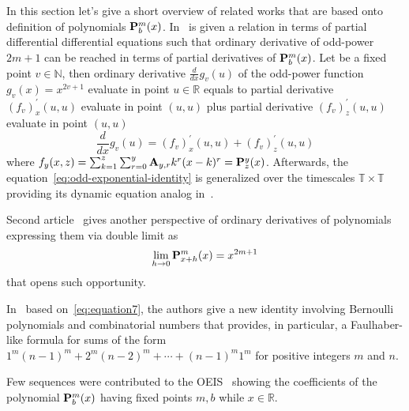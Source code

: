 In this section let's give a short overview of related works that are based onto definition
of polynomials ${\mathbf{P}}\sp{m} \sb{b}(x)$.
In~\cite{kolosov2023another} is given a relation in terms of partial differential differential equations such that
ordinary derivative of odd-power $2m+1$ can be reached in terms of partial derivatives of ${\mathbf{P}}\sp{m} \sb{b}(x)$.
Let be a fixed point $v\in \mathbb{N}$, then ordinary derivative $\frac{d}{dx} g_v (u)$ of the odd-power function $g_v(x) = x^{2v + 1}$
evaluate in point $u\in\mathbb{R}$ equals to partial derivative $(f_{v})^{'}_{x} (u, u)$ evaluate in point $(u, u)$ plus
partial derivative $(f_{v})^{'}_{z} (u, u)$ evaluate in point $(u, u)$
\begin{equation}
    \frac{d}{dx} g_v (u) = (f_{v})^{'}_{x} (u, u) + (f_{v})^{'}_{z} (u, u)
    \label{eq:odd-exponential-identity}
\end{equation}
where $f_{y} (x, z) = \sum_{k=1}^{z} \sum_{r=0}^{y} {\mathbf{A}} \sb{y,r} k^r (x-k)^r = {\mathbf{P}}\sp{y} \sb{z}(x)$.
Afterwards, the equation~\eqref{eq:odd-exponential-identity}
is generalized over the timescales $\mathbb{T} \times \mathbb{T}$ providing its dynamic equation analog
in~\cite{kolosov2016study}.

Second article~\cite{kolosov_2024_10575485} gives another perspective of ordinary derivatives of polynomials expressing
them via double limit as
\[
    \lim_{h \to 0} {\mathbf{P}}\sp{m} \sb{x+h}(x) = x^{2m+1}
\]
that opens such opportunity.

In~\cite{barbero2020two} based on~\eqref{eq:equation7}, the authors give a new identity involving
Bernoulli polynomials and combinatorial numbers that provides,
in particular, a Faulhaber-like formula for sums of the form $1^m(n-1)^m + 2^m (n -2)^m + \cdots + (n - 1)^m 1^m$ for
positive integers $m$ and $n$.

Few sequences were contributed to the
OEIS~\cite{kolosov2018coefficientspolynomial1, kolosov2018coefficientspolynomial2, kolosov2018coefficientspolynomial3}
showing the coefficients of the polynomial ${\mathbf{P}}\sp{m} \sb{b}(x)$ having fixed points $m,b$ while $x\in\mathbb{R}$.

